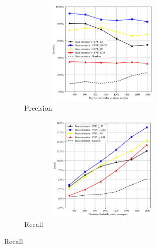\documentclass[10pt,journal,compsoc]{IEEEtran}
\begin{document}
\begin{figure}[!htbp]
	\centering
	\captionsetup{size=footnotesize}
	\begin{subfigure}{0.45\textwidth}
		\centering
		\captionsetup{skip=2pt}
		\captionsetup{size=scriptsize}
		\includegraphics[width=0.9\textwidth,height=5.1cm]{./Figure 4 (1) in JEPG format}
		\caption{Precision}
		\label{RQ2.3.sub1}
	\end{subfigure}
	\begin{subfigure}{0.45\textwidth}
		\centering
		\captionsetup{skip=2pt}
		\captionsetup{size=scriptsize}
		\includegraphics[width=0.9\textwidth,height=5.1cm]{./Figure 4 (2) in JEPG format}
		\caption{Recall}
		\label{RQ2.3.sub2}
	\end{subfigure}
	
	

\end{figure}
\end{document}
